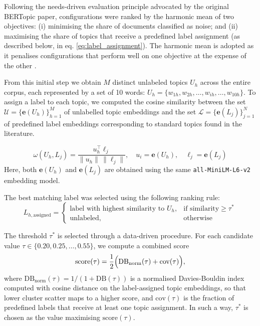 Following the needs-driven evaluation principle advocated by the original BERTopic paper, configurations were ranked by the harmonic mean of two objectives: (i) minimising the share of documents classified as noise; and (ii) maximising the share of topics that receive a predefined label assignment (as described below, in eq. \eqref{eq:label_assignment}). The harmonic mean is adopted as it penalises configurations that perform well on one objective at the expense of the other \citep{vanRijsbergen1979}.

From this initial step we obtain $M$ distinct unlabeled topics $U_h$ across the entire corpus, each represented by a set of 10 words: $U_h = \{ w_{1h}, w_{2h}, \dots, w_{ih}, \dots, w_{10h} \}$. To assign a label to each topic, we computed the cosine similarity between the set $\mathcal{U} = \{\mathbf{e}(U_h)\}_{h=1}^{M}$ of unlabelled topic embeddings and the set $\mathcal{L} = \{\mathbf{e}(L_j)\}_{j=1}^{N}$ of predefined label embeddings corresponding to standard topics found in the literature.

\begin{equation}\label{cosine}
\omega(U_h, L_j) = \frac{u_h^\top \ell_j}{\|u_h\| \, \|\ell_j\|}, \quad 
u_i = \mathbf{e}(U_h), \quad 
\ell_j = \mathbf{e}(L_j)
\end{equation}
Here, both $\mathbf{e}(U_h)$ and $\mathbf{e}(L_j)$ are obtained using the same \texttt{all-MiniLM-L6-v2} embedding model.

The best matching label was selected using the following ranking rule:
\begin{equation}\label{eq:label_assignment}
L_{h,\text{assigned}} = 
\begin{cases}
\text{label with highest similarity to } U_h, & \text{if similarity} \ge \tau^* \\
\text{unlabeled}, & \text{otherwise}
\end{cases}
\end{equation}


The threshold $\tau^*$ is selected through a data-driven procedure. For each candidate value $\tau \in \{0.20, 0.25, \dots, 0.55\}$, we compute a combined score 
\begin{equation}\label{eq:tau_opt}
    \text{score}(\tau) = \frac{1}{2}\Bigl(\text{DB}_{\text{norm}}(\tau) + \text{cov}(\tau)\Bigr),
\end{equation}
where $\text{DB}_{\text{norm}}(\tau) = 1/(1 + \text{DB}(\tau))$ is a normalised Davies-Bouldin index \citep{davies1979cluster} computed with cosine distance on the label-assigned topic embeddings, so that lower cluster scatter maps to a higher score, and $\text{cov}(\tau)$ is the fraction of predefined labels that receive at least one topic assignment. In such a way, $\tau^*$ is chosen as the value maximising $\text{score}(\tau)$.

